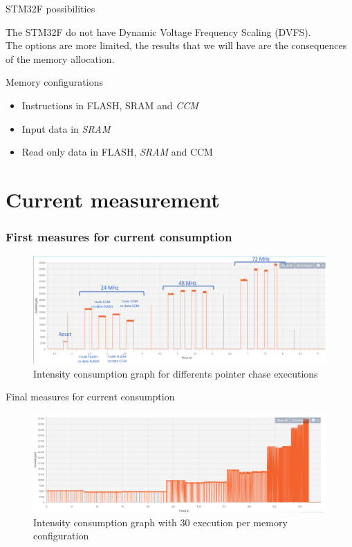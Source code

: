 \documentclass[
	11pt, %
]{beamer}
\begin{document}
\begin{frame}{STM32F possibilities}

\begin{block}{}
	The STM32F do not have Dynamic Voltage Frequency Scaling (DVFS).\\
	The options are more limited, the results that we will have are the consequences of the memory allocation.
\end{block}
\begin{block}{Memory configurations }
	\begin{itemize}
		\item Instructions in FLASH, SRAM and \emph{CCM}
		\item Input data in \emph{SRAM}
		\item Read only data in FLASH, \emph{SRAM} and CCM
	\end{itemize}
\end{block}
	
\end{frame}


\section{Current measurement} %
\begin{frame}
	\frametitle{First measures for current consumption}
	\begin{figure}
		\centering
        \includegraphics[scale=0.6]{images/pointer_chase_capture_mod.png}
        \caption{Intensity consumption graph for differents pointer chase executions}
	\end{figure}
\end{frame}

\begin{frame}{Final measures for current consumption}
	\begin{figure}
		\centering
        \includegraphics[scale=0.4]{images/pointer_chase30ex.png}
        \caption{Intensity consumption graph with 30 execution per memory configuration}
	\end{figure}
\end{frame}
\end{document}
